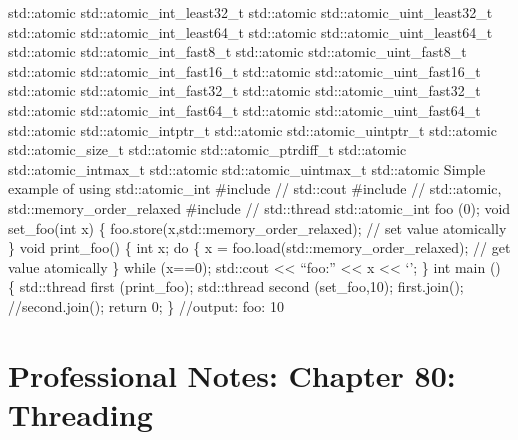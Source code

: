 std::atomic std::atomic\_int\_least32\_t std::atomic
std::atomic\_uint\_least32\_t std::atomic std::atomic\_int\_least64\_t
std::atomic std::atomic\_uint\_least64\_t std::atomic
std::atomic\_int\_fast8\_t std::atomic std::atomic\_uint\_fast8\_t
std::atomic std::atomic\_int\_fast16\_t std::atomic
std::atomic\_uint\_fast16\_t std::atomic std::atomic\_int\_fast32\_t
std::atomic std::atomic\_uint\_fast32\_t std::atomic
std::atomic\_int\_fast64\_t std::atomic std::atomic\_uint\_fast64\_t
std::atomic std::atomic\_intptr\_t std::atomic std::atomic\_uintptr\_t
std::atomic std::atomic\_size\_t std::atomic std::atomic\_ptrdiff\_t
std::atomic std::atomic\_intmax\_t std::atomic std::atomic\_uintmax\_t
std::atomic Simple example of using std::atomic\_int \#include //
std::cout \#include // std::atomic, std::memory\_order\_relaxed
\#include // std::thread std::atomic\_int foo (0); void set\_foo(int x)
\{ foo.store(x,std::memory\_order\_relaxed); // set value atomically \}
void print\_foo() \{ int x; do \{ x =
foo.load(std::memory\_order\_relaxed); // get value atomically \} while
(x==0); std::cout \textless\textless{} ``foo:'' \textless\textless{} x
\textless\textless{} `\n'; \} int main () \{ std::thread first
(print\_foo); std::thread second (set\_foo,10); first.join();
//second.join(); return 0; \} //output: foo: 10

\hypertarget{professional-notes-chapter-80-threading-1}{%
\section{Professional Notes: Chapter 80:
Threading}\label{professional-notes-chapter-80-threading-1}}

